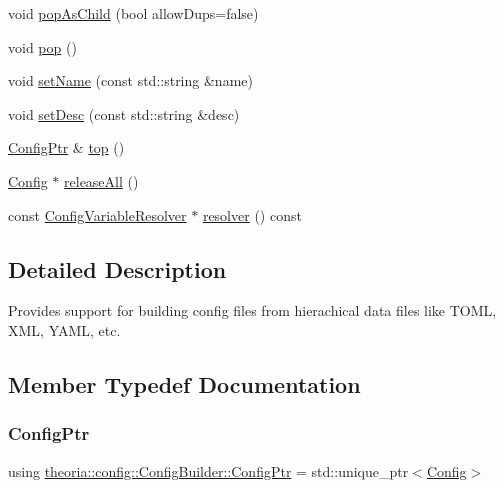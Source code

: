 \begin{DoxyCompactItemize}
\item 
void \hyperlink{classtheoria_1_1config_1_1ConfigBuilder_acd995045c0bf17d35da9573cf53ec791}{pop\+As\+Child} (bool allow\+Dups=false)
\item 
void \hyperlink{classtheoria_1_1config_1_1ConfigBuilder_accda8a312be22d56b33adb47d5b266e9}{pop} ()
\item 
void \hyperlink{classtheoria_1_1config_1_1ConfigBuilder_a19eea792ee2bc01c44806d2a5a9f666c}{set\+Name} (const std\+::string \&name)
\item 
void \hyperlink{classtheoria_1_1config_1_1ConfigBuilder_a7aa67220439e90e9fa59082355c8186f}{set\+Desc} (const std\+::string \&desc)
\item 
\hyperlink{classtheoria_1_1config_1_1ConfigBuilder_a31d4cfc983e8ad468c483822731d790f}{Config\+Ptr} \& \hyperlink{classtheoria_1_1config_1_1ConfigBuilder_a394d42770a90532be340a8af46868f79}{top} ()
\item 
\hyperlink{classtheoria_1_1config_1_1Config}{Config} $\ast$ \hyperlink{classtheoria_1_1config_1_1ConfigBuilder_a06911a804a22e89101dab7ca3a08b049}{release\+All} ()
\item 
const \hyperlink{classtheoria_1_1config_1_1ConfigVariableResolver}{Config\+Variable\+Resolver} $\ast$ \hyperlink{classtheoria_1_1config_1_1ConfigBuilder_aa40d918441c9cbc0b60bdcd39551164f}{resolver} () const
\end{DoxyCompactItemize}


\subsection{Detailed Description}
Provides support for building config files from hierachical data files like T\+O\+ML, X\+ML, Y\+A\+ML, etc. 

\subsection{Member Typedef Documentation}
\mbox{\label{classtheoria_1_1config_1_1ConfigBuilder_a31d4cfc983e8ad468c483822731d790f}} 
\subsubsection{\texorpdfstring{Config\+Ptr}{ConfigPtr}}
{\footnotesize\ttfamily using \hyperlink{classtheoria_1_1config_1_1ConfigBuilder_a31d4cfc983e8ad468c483822731d790f}{theoria\+::config\+::\+Config\+Builder\+::\+Config\+Ptr} =  std\+::unique\+\_\+ptr$<$\hyperlink{classtheoria_1_1config_1_1Config}{Config}$>$}

